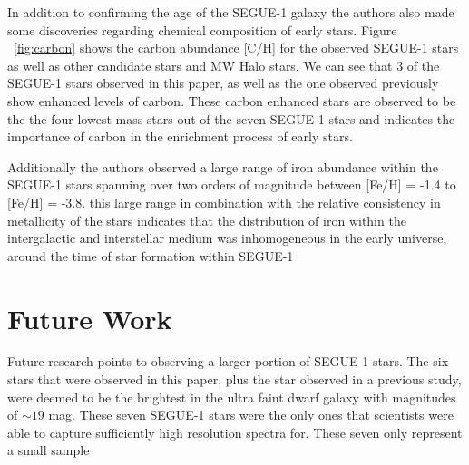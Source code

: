 \documentclass{aastex631}
\begin{document}
In addition to confirming the age of the SEGUE-1 galaxy the authors also made some discoveries regarding chemical composition of early
stars. Figure ~\ref{fig:carbon} shows the carbon abundance [C/H] for the observed SEGUE-1 stars as well as other candidate stars and
MW Halo stars. We can see that 3 of the SEGUE-1 stars observed in this paper, as well as the one observed previously show enhanced levels
of carbon. These carbon enhanced stars are observed to be the the four lowest mass stars out of the seven SEGUE-1 stars and indicates the
importance of carbon in the enrichment process of early stars.

Additionally the authors observed a large range of iron abundance within the SEGUE-1 stars spanning over two orders of magnitude between
[Fe/H] = -1.4 to [Fe/H] = -3.8. this large range in combination with the relative consistency in metallicity of the stars indicates that
the distribution of iron within the intergalactic and interstellar medium was inhomogeneous in the early universe, around the time of
star formation within SEGUE-1

\section{Future Work} \label{sec:future}

Future research points to observing a larger portion of SEGUE 1 stars. The six stars that were observed in this paper, plus the 
star observed in a previous study, were deemed to be the brightest in the ultra faint dwarf galaxy with magnitudes of $\sim 19$ mag.
These seven SEGUE-1 stars were the only ones that scientists were able to capture sufficiently high resolution spectra for. These seven
only represent a small sample 

\newpage


\nocite{*}

{}



\end{document}
